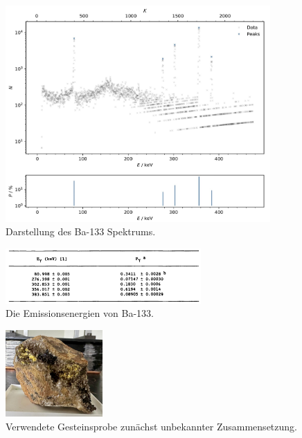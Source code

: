 \begin{figure}[H]
    \centering
    \includegraphics[width=0.9\textwidth]{content/plots/plot10.jpg}
    \caption{Darstellung des Ba-133 Spektrums.}
    \label{fig:plot10}
\end{figure}

\begin{figure}[H]
    \centering
    \includegraphics[width=0.666\textwidth]{content/grafik/baenergien.jpg}
    \caption{Die Emissionsenergien von Ba-133. \cite{Kalibration}}
    \label{fig:baE}
\end{figure}

\begin{figure}[H]
    \centering
    \includegraphics[width=0.33\textwidth]{content/grafik/unbekannt.jpg}
    \caption{Verwendete Gesteinsprobe zunächst unbekannter Zusammensetzung.}
    \label{fig:unbekannt}
\end{figure}

